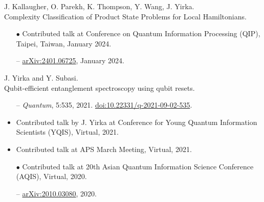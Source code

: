 \documentclass[11pt,letterpaper,serif]{moderncv}
\newcommand{\pubItemSep}{0em}
\begin{document}
J. Kallaugher, O. Parekh, K. Thompson, Y. Wang, J. Yirka.
\\Complexity Classification of Product State Problems for Local Hamiltonians.
\begin{adjustwidth}{.1in}{}
	\begin{itemize}[itemsep=\pubItemSep]
		\item[$\bullet$] Contributed talk at Conference on Quantum Information Processing (QIP), Taipei, Taiwan, January 2024.
		\item[--] \href{https://arxiv.org/abs/2401.06725}{arXiv:2401.06725}, January 2024.
	\end{itemize}
\end{adjustwidth}
\vspace{\parsep}

J. Yirka and Y. Subasi.
\\Qubit-efficient entanglement spectroscopy using qubit resets.
\begin{adjustwidth}{.1in}{}
	\begin{itemize}[itemsep=\pubItemSep]
		\item[--] \textit{Quantum}, 5:535, 2021. \href{https://doi.org/10.22331/q-2021-09-02-535}{doi:10.22331/q-2021-09-02-535}.
		\item Contributed talk by J. Yirka at Conference for Young Quantum Information Scientists (YQIS), Virtual, 2021.
		\item Contributed talk at APS March Meeting, Virtual, 2021.
		\item[$\bullet$] Contributed talk at 20th Asian Quantum Information Science Conference (AQIS), Virtual, 2020.
		\item[--] \href{https://arxiv.org/abs/2010.03080}{arXiv:2010.03080}, 2020.
	\end{itemize}
\end{adjustwidth}
\vspace{\parsep}
\end{document}
